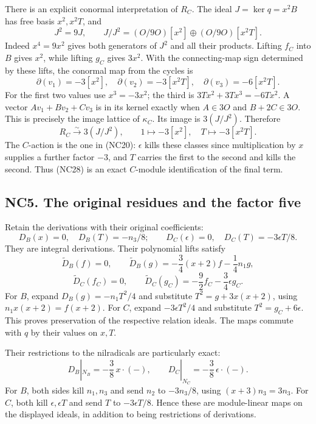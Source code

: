 \documentclass[
]{article}
\begin{document}
There is an explicit conormal interpretation of \(R_C\). The ideal
\(J=\ker q=x^2B\) has free basis \(x^2,x^2T\), and \[
J^2=9J,\qquad J/J^2=(O/9O)[x^2]\oplus(O/9O)[x^2T].
\tag{NC26}
\] Indeed \(x^4=9x^2\) gives both generators of \(J^2\) and all their
products. Lifting \(f_C\) into \(B\) gives \(x^2\), while lifting
\(g_C\) gives \(3x^2\). With the connecting-map sign determined by these
lifts, the conormal map from the cycles is \[
\partial(v_1)=-3[x^2],\quad
\partial(v_2)=-3[x^2T],\quad
\partial(v_3)=-6[x^2T].
\tag{NC27}
\] For the first two values use \(x^3=-3x^2\); the third is
\(3Tx^2+3Tx^3=-6Tx^2\). A vector \(Av_1+Bv_2+Cv_3\) is in its kernel
exactly when \(A\in3O\) and \(B+2C\in3O\). This is precisely the image
lattice of \(\kappa_C\). Its image is \(3(J/J^2)\). Therefore \[
R_C\xrightarrow{\sim}3(J/J^2),\qquad
1\mapsto-3[x^2],\quad T\mapsto-3[x^2T].
\tag{NC28}
\] The \(C\)-action is the one in (NC20): \(\epsilon\) kills these
classes since multiplication by \(x\) supplies a further factor \(-3\),
and \(T\) carries the first to the second and kills the second. Thus
(NC28) is an exact \(C\)-module identification of the final term.

\subsection{NC5. The original residues and the factor
five}\label{nc5.-the-original-residues-and-the-factor-five}

Retain the derivations with their original coefficients: \[
D_B(x)=0,\quad D_B(T)=-n_3/8;\qquad
D_C(\epsilon)=0,\quad D_C(T)=-3\epsilon T/8.
\tag{NC29}
\] They are integral derivations. Their polynomial lifts satisfy \[
\widetilde D_B(f)=0,\qquad
\widetilde D_B(g)=-\frac34(x+2)f-\frac14n_1g,
\] \[
\widetilde D_C(f_C)=0,\qquad
\widetilde D_C(g_C)=-\frac92f_C-\frac34\epsilon g_C.
\tag{NC30}
\] For \(B\), expand \(D_B(g)=-n_1T^2/4\) and substitute
\(T^2=g+3x(x+2)\), using \(n_1x(x+2)=f(x+2)\). For \(C\), expand
\(-3\epsilon T^2/4\) and substitute \(T^2=g_C+6\epsilon\). This proves
preservation of the respective relation ideals. The maps commute with
\(q\) by their values on \(x,T\).

Their restrictions to the nilradicals are particularly exact: \[
D_B|_{N_B}=-\frac38\,x\cdot(-),\qquad
D_C|_{N_C}=-\frac38\,\epsilon\cdot(-).
\tag{NC31}
\] For \(B\), both sides kill \(n_1,n_3\) and send \(n_2\) to
\(-3n_3/8\), using \((x+3)n_3=3n_3\). For \(C\), both kill
\(\epsilon,\epsilon T\) and send \(T\) to \(-3\epsilon T/8\). Hence
these are module-linear maps on the displayed ideals, in addition to
being restrictions of derivations.
\end{document}
